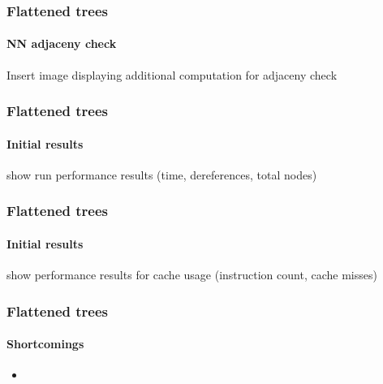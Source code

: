 \begin{frame}
  \frametitle{Flattened \kd trees}
  \framesubtitle{NN adjaceny check}

  Insert image displaying additional computation for adjaceny check

\end{frame}

\begin{frame}
  \frametitle{Flattened \kd trees}
  \framesubtitle{Initial results}

  show run performance results (time, dereferences, total nodes)

\end{frame}

\begin{frame}
  \frametitle{Flattened \kd trees}
  \framesubtitle{Initial results}

  show performance results for cache usage (instruction count, cache misses)

\end{frame}

\begin{frame}
  \frametitle{Flattened \kd trees}
  \framesubtitle{Shortcomings}

  \begin{itemize}
    \item 
  \end{itemize}

\end{frame}
